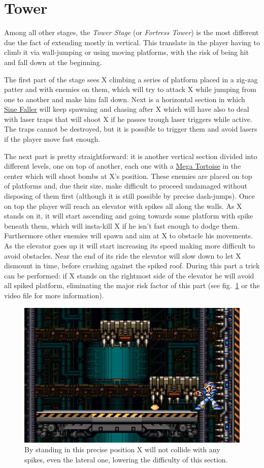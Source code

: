 \section{Tower}
Among all other stages, the \textit{Tower Stage} (or \textit{Fortress Tower}) is the most different due the fact of extending mostly in vertical. This translate in the player having to climb it via wall-jumping or using moving platforms, with the risk of being hit and fall down at the beginning.

The first part of the stage sees X climbing a series of platform placed in a zig-zag patter and with enemies on them, which will try to attack X while jumping from one to another and make him fall down. Next is a horizontal section in which \hyperlink{enem:Sine_Faller}{Sine Faller} will keep spawning and chasing after X which will have also to deal with laser traps that will shoot X if he passes trough laser triggers while active. The traps cannot be destroyed, but it is possible to trigger them and avoid lasers if the player move fast enough. 

The next part is pretty straightforward: it is another vertical section divided into different levels, one on top of another, each one with a \hyperlink{enem:Mega_Tortoise}{Mega Tortoise} in the center which will shoot bombs at X's position. These enemies are placed on top of platforms and, due their size, make difficult to proceed undamaged without disposing of them first (although it is still possible by precise dash-jumps). Once on top the player will reach an elevator with spikes all along the walls. As X stands on it, it will start ascending and going towards some platform with spike beneath them, which will insta-kill X if he isn't fast enough to dodge them. Furthermore other enemies will spawn and aim at X to obstacle his movements. As the elevator goes up it will start increasing its speed making more difficult to avoid obstacles. Near the end of its ride the elevator will slow down to let X dismount in time, before crashing against the spiked roof. During this part a trick can be performed: if X stands on the rightmost side of the elevator he will avoid all spiked platform, eliminating the major risk factor of this part (see fig.~\ref{tower_spike} or the video file  for more information). 
\begin{figure}[htp]
	\centering
	\includegraphics[width=0.5\linewidth]{figures/X1/Boomer_kuwanger/Tower_spike_skip.jpg}
	\caption{By standing in this precise position X will not collide with any spikes, even the lateral one, lowering the difficulty of this section.}
	\label{tower_spike}
\end{figure}


